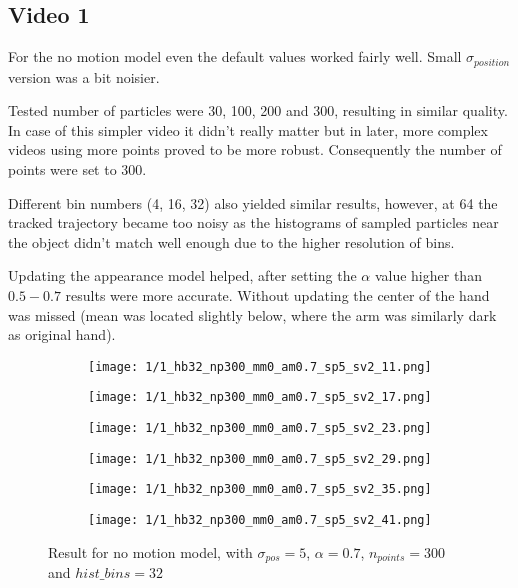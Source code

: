 \documentclass[10pt,a4paper,twoside]{article}
\newcommand{\sweepsize}{0.26}
\begin{document}
\subsection{Video 1}

For the no motion model even the default values worked fairly well. Small
$\sigma_{position}$ version was a bit noisier. 

Tested number of particles were 30, 100, 200 and 300, resulting in similar quality. In case of this simpler video it
didn't really matter but in later, more complex videos using more
points proved to be more robust. Consequently the number of points were set to 300.

Different bin numbers (4, 16, 32) also yielded similar results, however, at 64
the tracked trajectory became too noisy as the histograms of sampled particles
near the object didn't match well enough due to the higher resolution of bins.

Updating the appearance model helped, after setting the $\alpha$ value higher
than $0.5-0.7$ results were more accurate. Without updating the center of the
hand was missed (mean was located slightly below, where the arm was similarly
dark as original hand).

\begin{figure}[h]
    \centering
    \begin{subfigure}{\sweepsize\textwidth}
    \texttt{[image: 1/1\_hb32\_np300\_mm0\_am0.7\_sp5\_sv2\_11.png]} 
    \end{subfigure}
    \begin{subfigure}{\sweepsize\textwidth}
    \texttt{[image: 1/1\_hb32\_np300\_mm0\_am0.7\_sp5\_sv2\_17.png]} 
    \end{subfigure}
    \begin{subfigure}{\sweepsize\textwidth}
    \texttt{[image: 1/1\_hb32\_np300\_mm0\_am0.7\_sp5\_sv2\_23.png]} 
    \end{subfigure}
    \begin{subfigure}{\sweepsize\textwidth}
    \texttt{[image: 1/1\_hb32\_np300\_mm0\_am0.7\_sp5\_sv2\_29.png]} 
    \end{subfigure}
    \begin{subfigure}{\sweepsize\textwidth}
    \texttt{[image: 1/1\_hb32\_np300\_mm0\_am0.7\_sp5\_sv2\_35.png]} 
    \end{subfigure}
    \begin{subfigure}{\sweepsize\textwidth}
    \texttt{[image: 1/1\_hb32\_np300\_mm0\_am0.7\_sp5\_sv2\_41.png]} 
    \end{subfigure}
    \caption{Result for no motion model, with $\sigma_{pos}=5$, $\alpha=0.7$, $n_{points}=300$ and $hist\_bins=32$}
\end{figure}
\end{document}
